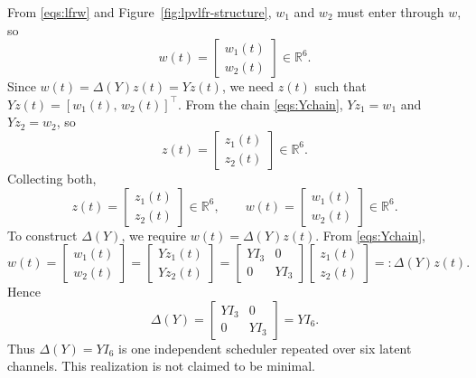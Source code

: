 \documentclass[11pt]{article}
\newcommand{\R}{\mathbb{R}}
\begin{document}
From \eqref{eqs:lfrw} and Figure~\ref{fig:lpvlfr-structure}, $w_1$ and $w_2$ must enter through $w$, so
\begin{equation}
    w(t) =
    \begin{bmatrix}
        w_1(t) \\
        w_2(t)
    \end{bmatrix}
    \in \R^6.
\end{equation}
Since $w(t) = \Delta(Y)z(t) = Y z(t)$, we need $z(t)$ such that $Yz(t) = [w_1(t),\, w_2(t)]^\top$.
From the chain \eqref{eqs:Ychain}, $Y z_1 = w_1$ and $Y z_2 = w_2$, so
\begin{equation}
    z(t) =
    \begin{bmatrix}
        z_1(t) \\
        z_2(t)
    \end{bmatrix}
    \in \R^6.
\end{equation}
Collecting both,
\begin{equation}
    z(t) =
    \begin{bmatrix}
        z_1(t) \\
        z_2(t)
    \end{bmatrix}
    \in \R^6,
    \qquad
    w(t) =
    \begin{bmatrix}
        w_1(t) \\
        w_2(t)
    \end{bmatrix}
    \in \R^6.
    \label{eqs:zw}
\end{equation}
To construct $\Delta(Y)$, we require $w(t) = \Delta(Y)z(t)$. From \eqref{eqs:Ychain},
\begin{equation}
    w(t) =
    \begin{bmatrix}
        w_1(t) \\
        w_2(t)
    \end{bmatrix}
    =
    \begin{bmatrix}
        Y z_1(t) \\
        Y z_2(t)
    \end{bmatrix}
    =
    \begin{bmatrix}
        Y I_3 & 0 \\
        0 & Y I_3
    \end{bmatrix}
    \begin{bmatrix}
        z_1(t) \\
        z_2(t)
    \end{bmatrix}
    =: \Delta(Y) z(t).
    \label{eqs:Deltaz}
\end{equation}
Hence
\begin{equation}
    \Delta(Y) =
    \begin{bmatrix}
        Y I_3 & 0 \\
        0 & Y I_3
    \end{bmatrix}
    = Y I_6.
    \label{eqs:Delta}
\end{equation}
Thus $\Delta(Y) = YI_6$ is one independent scheduler repeated over six latent
channels. This realization is not claimed to be minimal.
\end{document}

